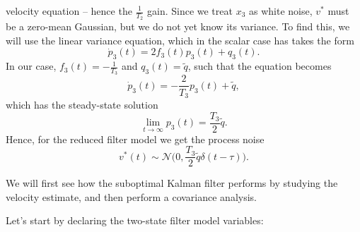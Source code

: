 \documentclass[11pt]{article}
\begin{document}
velocity equation -- hence the \(\frac{1}{T_2}\) gain. Since we treat
\(x_3\) as white noise, \(v^*\) must be a zero-mean Gaussian, but we do
not yet know its variance. To find this, we will use the linear variance
equation, which in the scalar case has takes the form \[
\dot{p}_3(t) = 2f_3(t)p_3(t) + q_3(t).
\] In our case, \(f_3(t) = -\frac{1}{T_3}\) and \(q_3(t) = \tilde{q}\),
such that the equation becomes \[
\dot{p}_3(t) = -\frac{2}{T_3} p_3(t) + \tilde{q},
\] which has the steady-state solution \[
\lim_{t \rightarrow \infty} p_3(t) = \frac{T_3}{2} \tilde{q}.
\] Hence, for the reduced filter model we get the process noise \[
v^*(t) \sim \mathcal{N} \big( 0, \frac{T_3}{2} \tilde{q} \delta(t - \tau) \big).
\]

We will first see how the suboptimal Kalman filter performs by studying
the velocity estimate, and then perform a covariance analysis.

Let's start by declaring the two-state filter model variables:
\end{document}
